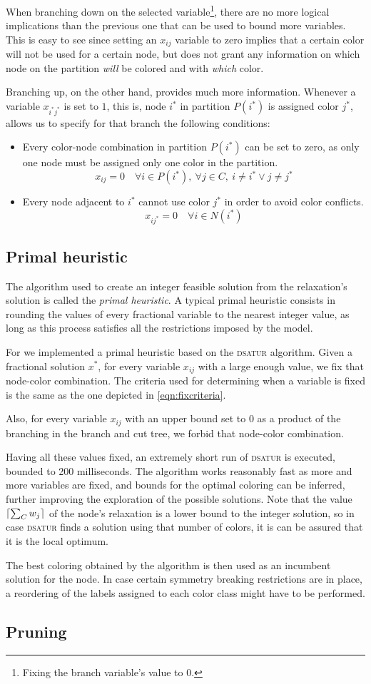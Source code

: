 When branching down on the selected variable\footnote{Fixing the branch variable's value to 0.}, there are no more logical implications than the previous one that can be used to bound more variables. This is easy to see since setting an $x_{ij}$ variable to zero implies that a certain color will not be used for a certain node, but does not grant any information on which node on the partition \textit{will} be colored and with \textit{which} color.

Branching up, on the other hand, provides much more information. Whenever a variable $x_{i^*j^*}$ is set to $1$, this is, node $i^*$ in partition $P(i^*)$ is assigned color $j^*$, allows us to specify for that branch the following conditions:

\begin{itemize}
\item Every color-node combination in partition $P(i^*)$ can be set to zero, as only one node must be assigned only one color in the partition.
\[
x_{ij} = 0 \quad \forall i \in P(i^*),\ \forall j \in C,\ i \neq i^* \vee j \neq j^*
\]

\item Every node adjacent to $i^*$ cannot use color $j^*$ in order to avoid color conflicts.
\[
x_{ij^*} = 0 \quad \forall i \in N(i^*)
\]
\end{itemize}

\subsection{Primal heuristic}

The algorithm used to create an integer feasible solution from the relaxation's solution is called the \textit{primal heuristic}. A typical primal heuristic consists in rounding the values of every fractional variable to the nearest integer value, as long as this process satisfies all the restrictions imposed by the model.

For \PCP{} we implemented a primal heuristic based on the \textsc{dsatur} algorithm. Given a fractional solution $x^*$, for every variable $x_{ij}$ with a large enough value, we fix that node-color combination. The criteria used for determining when a variable is fixed is the same as the one depicted in \ref{eqn:fixcriteria}.

Also, for every variable $x_{ij}$ with an upper bound set to $0$ as a product of the branching in the branch and cut tree, we forbid that node-color combination.

Having all these values fixed, an extremely short run of \textsc{dsatur} is executed, bounded to 200 milliseconds. The algorithm works reasonably fast as more and more variables are fixed, and bounds for the optimal coloring can be inferred, further improving the exploration of the possible solutions. Note that the value $\left\lceil \sum_C w_j \right\rceil$ of the node's relaxation is a lower bound to the integer solution, so in case \textsc{dsatur} finds a solution using that number of colors, it is can be assured that it is the local optimum.

The best coloring obtained by the algorithm is then used as an incumbent solution for the node. In case certain symmetry breaking restrictions are in place, a reordering of the labels assigned to each color class might have to be performed.

\subsection{Pruning}